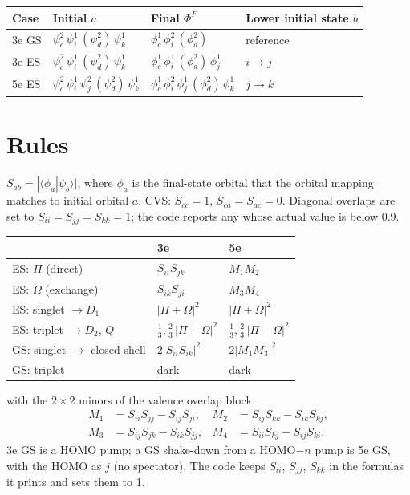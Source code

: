 \documentclass[11pt]{article}
\begin{document}
\begin{center}
\small
\begin{tabular}{@{}llll@{}}
\toprule
Case & Initial $a$ & Final $\Phi^F$ & Lower initial state $b$ \\
\midrule
3e GS & $\psi_c^2\,\psi_i^1\,(\psi_d^2)\,\psi_k^1$ & $\phi_c^1\,\phi_i^2\,(\phi_d^2)$ & reference \\
3e ES & $\psi_c^2\,\psi_i^1\,(\psi_d^2)\,\psi_k^1$ & $\phi_c^1\,\phi_i^1\,(\phi_d^2)\,\phi_j^1$ & $i\to j$ \\
5e ES & $\psi_c^2\,\psi_i^1\,\psi_j^2\,(\psi_d^2)\,\psi_k^1$ & $\phi_c^1\,\phi_i^2\,\phi_j^1\,(\phi_d^2)\,\phi_k^1$ & $j\to k$ \\
\bottomrule
\end{tabular}
\end{center}

\section{Rules}

$S_{ab}=|\langle\phi_a|\psi_b\rangle|$, where $\phi_a$ is the final-state orbital that the
orbital mapping matches to initial orbital $a$. CVS: $S_{cc}=1$, $S_{ca}=S_{ac}=0$.
Diagonal overlaps are set to $S_{ii}=S_{jj}=S_{kk}=1$; the code reports any whose actual
value is below 0.9.

\begin{center}
\begin{tabular}{@{}lll@{}}
\toprule
& 3e & 5e \\
\midrule
ES: $\Pi$ (direct) & $S_{ii}S_{jk}$ & $M_1M_2$ \\
ES: $\Omega$ (exchange) & $S_{ik}S_{ji}$ & $M_3M_4$ \\
ES: singlet $\to D_1$ & $|\Pi+\Omega|^2$ & $|\Pi+\Omega|^2$ \\
ES: triplet $\to D_2$, $Q$ & $\tfrac13,\tfrac23\,|\Pi-\Omega|^2$ & $\tfrac13,\tfrac23\,|\Pi-\Omega|^2$ \\
GS: singlet $\to$ closed shell & $2|S_{ii}S_{ik}|^2$ & $2|M_1M_3|^2$ \\
GS: triplet & dark & dark \\
\bottomrule
\end{tabular}
\end{center}
with the $2\times2$ minors of the valence overlap block
\begin{align*}
M_1&=S_{ii}S_{jj}-S_{ij}S_{ji}, & M_2&=S_{ij}S_{kk}-S_{ik}S_{kj},\\
M_3&=S_{ij}S_{jk}-S_{ik}S_{jj}, & M_4&=S_{ii}S_{kj}-S_{ij}S_{ki}.
\end{align*}
3e GS is a HOMO pump; a GS shake-down from a HOMO$-n$ pump is 5e GS, with the HOMO as $j$
(no spectator). The code keeps $S_{ii}$, $S_{jj}$, $S_{kk}$ in the formulas it prints and
sets them to 1.
\end{document}
